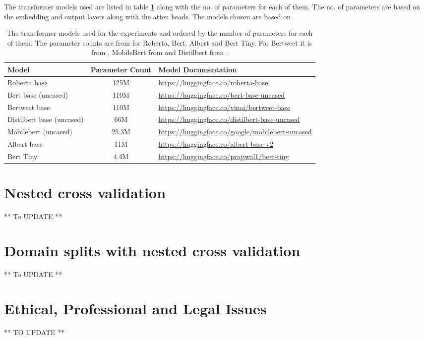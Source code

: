 The transformer models used are listed in table \ref{tab: model_dtls} along with the no. of parameters for each of them. The no. of parameters are based on the embedding and output layers along with the atten heads. The models chosen are based on 

\begin{table}[ht]
    \captionsetup{font=small}
    \centering
    \begin{tabularx}{\textwidth}{|l|c|X|}
        \hline
        \rowcolor[gray]{0.7}
        \textbf{Model} & \textbf{Parameter Count} & \textbf{Model Documentation} \\
        \hline
        Roberta base & 125M & \small{\url{https://huggingface.co/roberta-base}} \\
        \hline 
        Bert base (uncased) & 110M & \small{\url{https://huggingface.co/bert-base-uncased}} \\
        \hline
        Bertweet base & 110M & \small{\url{https://huggingface.co/vinai/bertweet-base}} \\
        \hline
        Distilbert base (uncased) & 66M & \small{\url{https://huggingface.co/distilbert-base-uncased}} \\
        \hline
        Mobilebert (uncased) & 25.3M & \small{\url{https://huggingface.co/google/mobilebert-uncased}} \\
        \hline
        Albert base & 11M & \small{\url{https://huggingface.co/albert-base-v2}} \\
        \hline
        Bert Tiny & 4.4M & \small{\url{https://huggingface.co/prajjwal1/bert-tiny}} \\
        \hline
    \end{tabularx}
    \caption{The transformer models used for the experiments and ordered by the number of parameters for each of them. The parameter counts are from \cite{bhargavaGeneralizationNLIWays2021} for Roberta, Bert, Albert and Bert Tiny. For Bertweet it is from \cite{nguyenBERTweetPretrainedLanguage2020}, MobileBert from \cite{sunMobileBERTCompactTaskAgnostic2020} and Distilbert from \cite{sanhDistilBERTDistilledVersion2020}.}    
    \label{tab: model_dtls}
\end{table} 
\section{Nested cross validation}
** To UPDATE **

\section{Domain splits with nested cross validation}
** To UPDATE **

\section{Ethical, Professional and Legal Issues}
** TO UPDATE **
